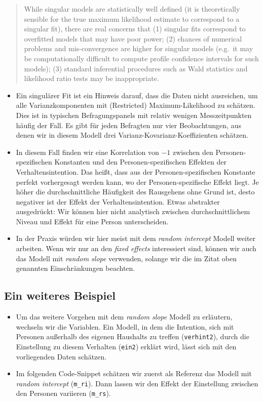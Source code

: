 \documentclass[
]{book}
\providecommand{\tightlist}{%
  \setlength{\itemsep}{0pt}\setlength{\parskip}{0pt}}
\begin{document}
\begin{quote}
While singular models are statistically well defined (it is theoretically sensible for the true maximum likelihood estimate to correspond to a singular fit), there are real concerns that (1) singular fits correspond to overfitted models that may have poor power; (2) chances of numerical problems and mis-convergence are higher for singular models (e.g.~it may be computationally difficult to compute profile confidence intervals for such models); (3) standard inferential procedures such as Wald statistics and likelihood ratio tests may be inappropriate.
\end{quote}

\begin{itemize}
\tightlist
\item
  Ein singulärer Fit ist ein Hinweis darauf, dass die Daten nicht ausreichen, um alle Varianzkomponenten mit (Restricted) Maximum-Likelihood zu schätzen. Dies ist in typischen Befragungspanels mit relativ wenigen Messzeitpunkten häufig der Fall. Es gibt für jeden Befragten nur vier Beobachtungen, aus denen wir in diesem Modell drei Varianz-Kovarianz-Koeffizienten schätzen.
\item
  In diesem Fall finden wir eine Korrelation von \(-1\) zwischen den Personen-spezifischen Konstanten und den Personen-spezifischen Effekten der Verhaltensintention. Das heißt, dass aus der Personen-spezifischen Konstante perfekt vorhergesagt werden kann, wo der Personen-spezifische Effekt liegt. Je höher die durchschnittliche Häufigkeit des Rausgehens ohne Grund ist, desto negativer ist der Effekt der Verhaltensintention. Etwas abstrakter ausgedrückt: Wir können hier nicht analytisch zwischen durchschnittlichem Niveau und Effekt für eine Person unterscheiden.
\item
  In der Praxis würden wir hier meist mit dem \emph{random intercept} Modell weiter arbeiten. Wenn wir nur an den \emph{fixed effects} interessiert sind, können wir auch das Modell mit \emph{random slope} verwenden, solange wir die im Zitat oben genannten Einschränkungen beachten.
\end{itemize}

\hypertarget{ein-weiteres-beispiel}{%
\subsection*{Ein weiteres Beispiel}\label{ein-weiteres-beispiel}}

\begin{itemize}
\tightlist
\item
  Um das weitere Vorgehen mit dem \emph{random slope} Modell zu erläutern, wechseln wir die Variablen. Ein Modell, in dem die Intention, sich mit Personen außerhalb des eigenen Haushalts zu treffen (\texttt{verhint2}), durch die Einstellung zu diesem Verhalten (\texttt{ein2}) erklärt wird, lässt sich mit den vorliegenden Daten schätzen.
\item
  Im folgenden Code-Snippet schätzen wir zuerst als Referenz das Modell mit \emph{random intercept} (\texttt{m\_ri}). Dann lassen wir den Effekt der Einstellung zwischen den Personen variieren (\texttt{m\_rs}).
\end{itemize}
\end{document}

